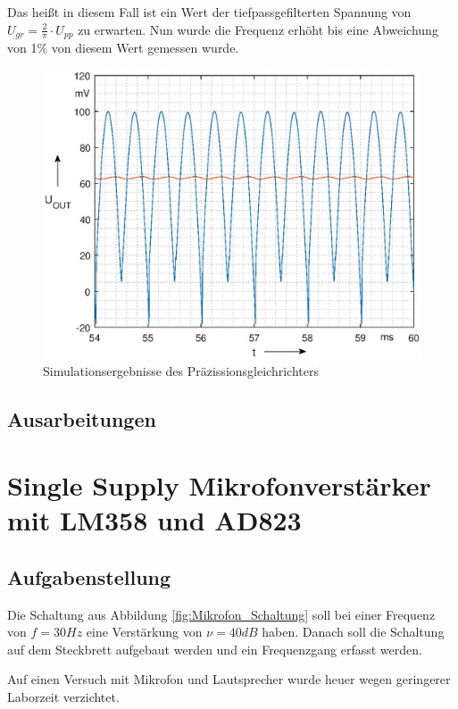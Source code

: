 Das heißt in diesem Fall ist ein Wert der tiefpassgefilterten Spannung von $U_{gr} =\frac{2}{\pi}\cdot U_{pp}$ zu erwarten. Nun wurde die Frequenz erhöht bis eine Abweichung von 1\% von diesem Wert gemessen wurde.

\begin{figure}[H]
    \centering
    \includegraphics[width=\textwidth]{Lab_3/Plots/Gleichrichter.eps}
    \caption{Simulationsergebnisse des Präzissionsgleichrichters}
    \label{fig:sim_Gleichrichter}
\end{figure}
\subsection{Ausarbeitungen}

\section{Single Supply Mikrofonverstärker mit LM358 und AD823}
\subsection{Aufgabenstellung}
Die Schaltung aus Abbildung \ref{fig:Mikrofon_Schaltung} soll bei einer Frequenz von $f=30Hz$ eine Verstärkung von $\nu = 40dB$ haben. 
Danach soll die Schaltung auf dem Steckbrett aufgebaut werden und ein Frequenzgang erfasst werden.

Auf einen Versuch mit Mikrofon und Lautsprecher wurde heuer wegen geringerer Laborzeit verzichtet. 

